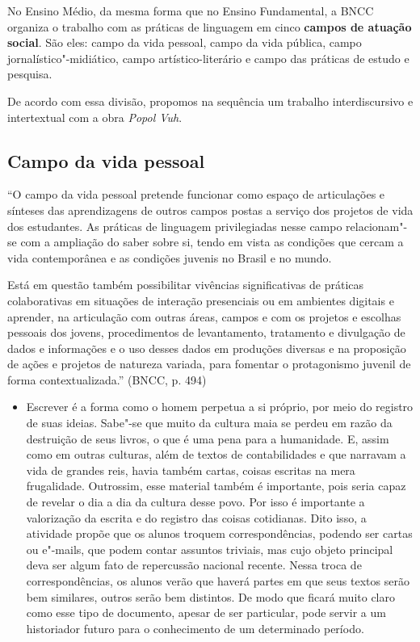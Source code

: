 \documentclass[12pt]{extarticle}
\begin{document}


No Ensino Médio, da mesma forma que no Ensino Fundamental, a BNCC
organiza o trabalho com as práticas de linguagem em cinco \textbf{campos
de atuação social}. São eles: campo da vida pessoal, campo da vida
pública, campo jornalístico"-midiático, campo artístico-literário e campo
das práticas de estudo e pesquisa.

De acordo com essa divisão, propomos na sequência um trabalho
interdiscursivo e intertextual com a obra \emph{Popol Vuh}.

\subsection{Campo da vida pessoal}

``O campo da vida pessoal pretende funcionar como espaço de articulações
e sínteses das aprendizagens de outros campos postas a serviço dos
projetos de vida dos estudantes. As práticas de linguagem privilegiadas
nesse campo relacionam"-se com a ampliação do saber sobre si, tendo em
vista as condições que cercam a vida contemporânea e as condições
juvenis no Brasil e no mundo.

Está em questão também possibilitar vivências significativas de práticas
colaborativas em situações de interação presenciais ou em ambientes
digitais e aprender, na articulação com outras áreas, campos e com os
projetos e escolhas pessoais dos jovens, procedimentos de levantamento,
tratamento e divulgação de dados e informações e o uso desses dados em
produções diversas e na proposição de ações e projetos de natureza
variada, para fomentar o protagonismo juvenil de forma
contextualizada.'' (BNCC, p. 494)

\begin{itemize}
\item
  Escrever é a forma como o homem perpetua a si próprio, por meio do
  registro de suas ideias. Sabe"-se que muito da cultura maia se perdeu
  em razão da destruição de seus livros, o que é uma pena para a
  humanidade. E, assim como em outras culturas, além de textos de
  contabilidades e que narravam a vida de grandes reis, havia também
  cartas, coisas escritas na mera frugalidade. Outrossim, esse material
  também é importante, pois seria capaz de revelar o dia a dia da
  cultura desse povo. Por isso é importante a valorização da escrita e
  do registro das coisas cotidianas. Dito isso, a atividade propõe que
  os alunos troquem correspondências, podendo ser cartas ou e"-mails, que
  podem contar assuntos triviais, mas cujo objeto principal deva ser
  algum fato de repercussão nacional recente. Nessa troca de
  correspondências, os alunos verão que haverá partes em que seus textos
  serão bem similares, outros serão bem distintos. De modo que ficará
  muito claro como esse tipo de documento, apesar de ser particular,
  pode servir a um historiador futuro para o conhecimento de um
  determinado período.
\end{itemize}
\end{document}
